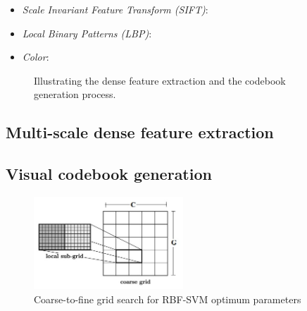 \documentclass[12pt]{article}
\begin{document}
\begin{itemize}

\item \textit{Scale Invariant Feature Transform (SIFT)}:

\item \textit{Local Binary Patterns (LBP)}:

\item \textit{Color}:

\end{itemize}

\begin{figure}
\centering
{}
\caption{Illustrating the dense feature extraction and the codebook generation process.}
\end{figure}


\subsection{Multi-scale dense feature extraction}


\subsection{Visual codebook generation}


\begin{figure}[H]
\centering
\includegraphics[width = 0.5\textwidth, height =0.2\textheight]{gridsearch}
\caption{Coarse-to-fine grid search for RBF-SVM optimum parameters}
\label{fig:gridsearch}
\end{figure}
\end{document}
